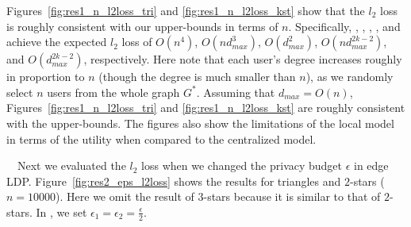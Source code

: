 
Figures~\ref{fig:res1_n_l2loss_tri} and \ref{fig:res1_n_l2loss_kst} show that the $l_2$ loss is roughly consistent with 
our upper-bounds in terms of $n$. 
Specifically, 
, 
,  , 
, and 
 achieve 
the expected $l_2$ loss of $O(n^4)$, $O(nd_{max}^3)$, $O(d_{max}^2)$, $O(nd_{max}^{2k-2})$, and $O(d_{max}^{2k-2})$, respectively. 
Here note that 
each user's degree increases roughly in proportion to $n$ (though the degree is much smaller than $n$), 
as we randomly select $n$ users from the whole graph $G^*$. Assuming that $d_{max} = O(n)$,  Figures~\ref{fig:res1_n_l2loss_tri} and \ref{fig:res1_n_l2loss_kst} are roughly consistent with the upper-bounds. 
The figures also show the limitations of the local model in terms of the utility when compared to the centralized model.


\smallskip
{}~~Next we evaluated the $l_2$ loss 
when we changed the privacy budget $\epsilon$ in edge LDP. 
Figure~\ref{fig:res2_eps_l2loss} shows the results for triangles and $2$-stars ($n=10000$). 
Here we omit the result of $3$-stars because it is similar to that of $2$-stars. 
In , we set $\epsilon_1 = \epsilon_2 = \frac{\epsilon}{2}$. 

